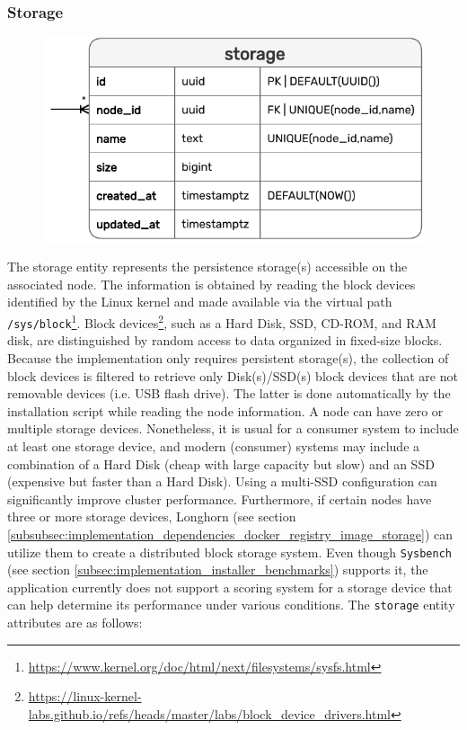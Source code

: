 \pagebreak


\subsubsection{Storage}
\label{subsubsec:implementation_server_database_storage}

\begin{figure}[htbp]
  \centering
  \includegraphics[width=.75\textwidth]{images/implementation/erm_storage.pdf}
\end{figure}

The storage entity represents the persistence storage(s) accessible on the
associated node.
\newline
The information is obtained by reading the block devices identified by the Linux
kernel and made available via the virtual path \texttt{/sys/block}\footnote{\url{https://www.kernel.org/doc/html/next/filesystems/sysfs.html}}.
Block devices\footnote{\url{https://linux-kernel-labs.github.io/refs/heads/master/labs/block_device_drivers.html}},
such as a Hard Disk, SSD, CD-ROM, and RAM disk, are distinguished by random access
to data organized in fixed-size blocks. Because the implementation only requires
persistent storage(s), the collection of block devices is filtered to retrieve
only Disk(s)/SSD(s) block devices that are not removable devices (i.e. USB flash
drive). The latter is done automatically by the installation script while
reading the node information.
\newline
A node can have zero or multiple storage devices. Nonetheless, it is usual for a
consumer system to include at least one storage device, and modern (consumer)
systems may include a combination of a Hard Disk (cheap with large capacity but slow)
and an SSD (expensive but faster than a Hard Disk). Using a multi-SSD configuration
can significantly improve cluster performance. Furthermore, if certain nodes have
three or more storage devices, Longhorn (see section \ref{subsubsec:implementation_dependencies_docker_registry_image_storage})
can utilize them to create a distributed block storage system.
\newline
Even though \texttt{Sysbench} (see section \ref{subsec:implementation_installer_benchmarks})
supports it, the application currently does not support a scoring system for a storage
device that can help determine its performance under various conditions. The
\texttt{storage} entity attributes are as follows:

